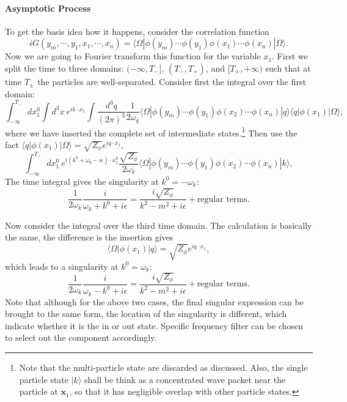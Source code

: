 \documentclass[aps,prb,superscriptaddress,nofootinbib]{revtex4}
\begin{document}
\paragraph*{Asymptotic Process}
To get the basis idea how it happens, consider the correlation function
\begin{equation}
	iG(y_m,\cdots,y_1,x_1,\cdots,x_n) = \langle\Omega|\phi(y_m)\cdots\phi(y_1) \phi(x_1)\cdots\phi(x_n)|\Omega\rangle.
\end{equation}
Now we are going to Fourier transform this function for the variable $x_1$.
First we split the time to three domains: $(-\infty,T_-]$, $(T_-,T_+)$, and $[T_+,+\infty)$ such that at time $T_{\pm}$ the particles are well-separated.
Consider first the integral over the first domain:
\begin{equation}
	\int_{-\infty}^{T_-} dx_1^0 \int d^3 x\ e^{i k\cdot x_1} \int \frac{d^3q}{(2\pi)^3}\frac{1}{2\omega_q}\langle \Omega|\phi(y_m)\cdots\phi(y_1) \phi(x_2)\cdots\phi(x_n)|q\rangle \langle q|\phi(x_1) |\Omega\rangle,
\end{equation}
where we have inserted the complete set of intermediate states.\footnote{Note that the multi-particle state are discarded as discussed. Also, the single particle state $|k\rangle$ shall be think as a concentrated wave packet near the particle at $\bm x_1$, so that it has negligible overlap with other particle states.}
Then use the fact $\langle q|\phi(x_1)|\Omega\rangle = \sqrt{Z_\phi} e^{i q \cdot x_1}$, 
\begin{equation}
	\int_{-\infty}^{T_-} dx_1^0 \ e^{i (k^0+\omega_q-i\epsilon)\cdot x_1^0}\frac{\sqrt{Z_\phi}}{2\omega_k}\langle \Omega|\phi(y_m)\cdots\phi(y_1) \phi(x_2)\cdots\phi(x_n)|k\rangle,
\end{equation}
The time integral gives the singularity at $k^0=-\omega_k$:
\begin{equation}
	\frac{1}{2\omega_k} \frac{i}{\omega_k+k^0 + i\epsilon} = \frac{i\sqrt{Z_\phi}}{k^2-m^2+i\epsilon} + \text{regular terms}.
\end{equation}

Now consider the integral over the third time domain.
The calculation is basically the same, the difference is the insertion gives
\begin{equation*}
	\langle\Omega| \phi(x_1) |q\rangle = \sqrt{Z_\phi} e^{i q \cdot x_1},
\end{equation*}
which leads to a singularity at $k^0=\omega_k$:
\begin{equation}
	\frac{1}{2\omega_k} \frac{i}{\omega_k-k^0 + i\epsilon} = \frac{i\sqrt{Z_\phi}}{k^2-m^2+i\epsilon} + \text{regular terms}.
\end{equation}
Note that although for the above two cases, the final singular expression can be brought to the same form, the location of the singularity is different, which indicate whether it is the in or out state.
Specific frequency filter can be chosen to select out the component accordingly.
\end{document}
